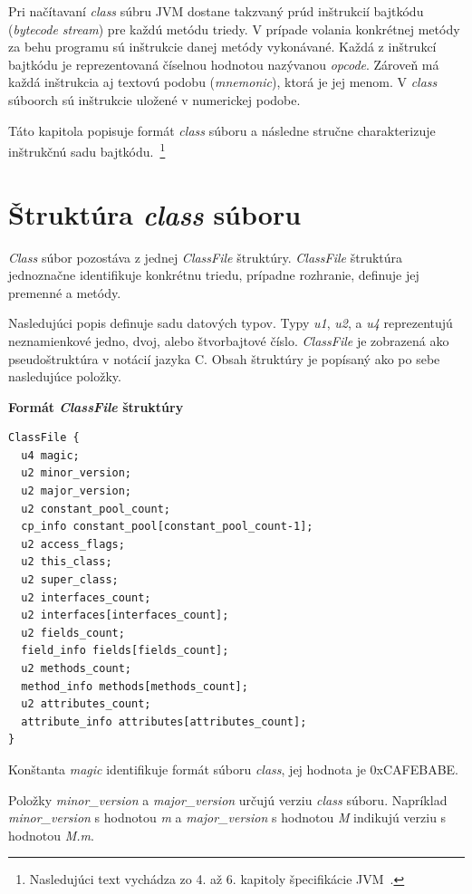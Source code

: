 \documentclass[11pt,final,oneside]{fithesis}
\newenvironment{example}[1]
{
\vspace{5mm}
\noindent\textbf{#1}
\vspace{1mm}
}
{
\vspace{5mm}
}
\begin{document}
Pri načítavaní \textit{class} súbru JVM dostane takzvaný prúd inštrukcií
bajtkódu (\textit{bytecode stream}) pre každú metódu triedy. V prípade volania
konkrétnej metódy za behu programu sú inštrukcie danej metódy vykonávané.
Každá z inštrukcí bajtkódu je reprezentovaná číselnou hodnotou nazývanou
\textit{opcode}. Zároveň má každá inštrukcia aj textovú podobu (\textit
{mnemonic}), ktorá je jej menom. V \textit{class} súboorch sú
inštrukcie uložené v numerickej podobe.

Táto kapitola popisuje formát \textit{class} súboru a následne stručne
charakterizuje inštrukčnú sadu bajtkódu.~\footnote{Nasledujúci text vychádza 
zo 4. až 6. kapitoly špecifikácie JVM~\cite{Lindholm:2013:JVM:2462629}.}

\section{Štruktúra \textit{class} súboru}
\label{sec:classFile}
\textit{Class} súbor pozostáva z jednej \textit{ClassFile} štruktúry. \textit
{ClassFile} štruktúra jednoznačne identifikuje konkrétnu triedu, prípadne
rozhranie, definuje jej premenné a metódy.

Nasledujúci popis definuje sadu datových typov. Typy \textit {u1},
\textit {u2}, a \textit {u4} reprezentujú neznamienkové jedno, dvoj, alebo
štvorbajtové číslo. \textit {ClassFile} je zobrazená ako pseudoštruktúra v
notácií jazyka C. Obsah štruktúry je popísaný ako po sebe nasledujúce položky.

\begin{example}{Formát \textit{ClassFile} štruktúry}
\begin{verbatim}
ClassFile {
  u4 magic;
  u2 minor_version;
  u2 major_version;
  u2 constant_pool_count;
  cp_info constant_pool[constant_pool_count-1];
  u2 access_flags;
  u2 this_class;
  u2 super_class;
  u2 interfaces_count;
  u2 interfaces[interfaces_count];
  u2 fields_count;
  field_info fields[fields_count];
  u2 methods_count;
  method_info methods[methods_count];
  u2 attributes_count;
  attribute_info attributes[attributes_count];
}
\end{verbatim}
\end{example}

Konštanta \textit{magic} identifikuje formát súboru \textit{class},
jej hodnota je 0xCAFEBABE.

Položky \textit{minor\_version} a \textit{major\_version}
určujú verziu \textit{class} súboru. Napríklad \textit{minor\_version} s
hodnotou \textit{m} a \textit{major\_version} s hodnotou \textit{M} indikujú
verziu s hodnotou \textit{M.m}.
\end{document}
